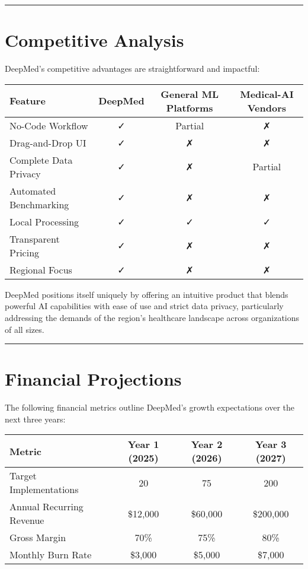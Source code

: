 \documentclass[11pt,a4paper]{article}
\begin{document}
\bigskip\hrule\bigskip

\section{Competitive Analysis}
DeepMed's competitive advantages are straightforward and impactful:
\begin{longtable}{@{}lccc@{}}
\toprule
\textbf{Feature}               & \textbf{DeepMed} & \textbf{General ML Platforms} & \textbf{Medical-AI Vendors} \\ \midrule
No-Code Workflow               & ✓                & Partial                       & ✗                           \\
Drag-and-Drop UI               & ✓                & ✗                             & ✗                           \\
Complete Data Privacy          & ✓                & ✗                             & Partial                     \\
Automated Benchmarking         & ✓                & ✗                             & ✗                           \\
Local Processing               & ✓                & ✓                             & ✓                           \\
Transparent Pricing            & ✓                & ✗                             & ✗                           \\
Regional Focus                 & ✓                & ✗                             & ✗                           \\ \bottomrule
\end{longtable}

DeepMed positions itself uniquely by offering an intuitive product that blends powerful AI capabilities with ease of use and strict data privacy, particularly addressing the demands of the region's healthcare landscape across organizations of all sizes.

\bigskip\hrule\bigskip

\section{Financial Projections}
The following financial metrics outline DeepMed's growth expectations over the next three years:
\begin{longtable}{@{}lccc@{}}
\toprule
\textbf{Metric}                & \textbf{Year 1 (2025)} & \textbf{Year 2 (2026)} & \textbf{Year 3 (2027)} \\ \midrule
Target Implementations         & 20                     & 75                     & 200                    \\
Annual Recurring Revenue       & \$12,000               & \$60,000               & \$200,000              \\
Gross Margin                   & 70\%                   & 75\%                   & 80\%                   \\
Monthly Burn Rate              & \$3,000                & \$5,000                & \$7,000                \\ \bottomrule
\end{longtable}
\end{document}
